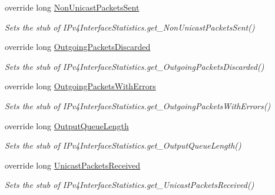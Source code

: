 \begin{DoxyCompactItemize}
override long \hyperlink{class_system_1_1_net_1_1_network_information_1_1_fakes_1_1_stub_i_pv4_interface_statistics_af027ee39d3f0a87b27ffb128e4765782}{Non\-Unicast\-Packets\-Sent}
\begin{DoxyCompactList}\small\item\em Sets the stub of I\-Pv4\-Interface\-Statistics.\-get\-\_\-\-Non\-Unicast\-Packets\-Sent()\end{DoxyCompactList}\item 
override long \hyperlink{class_system_1_1_net_1_1_network_information_1_1_fakes_1_1_stub_i_pv4_interface_statistics_a10319c5811007eefa7d71c19aee2edcc}{Outgoing\-Packets\-Discarded}
\begin{DoxyCompactList}\small\item\em Sets the stub of I\-Pv4\-Interface\-Statistics.\-get\-\_\-\-Outgoing\-Packets\-Discarded()\end{DoxyCompactList}\item 
override long \hyperlink{class_system_1_1_net_1_1_network_information_1_1_fakes_1_1_stub_i_pv4_interface_statistics_ab53dafc2110d16dbc34435896f55e4a5}{Outgoing\-Packets\-With\-Errors}
\begin{DoxyCompactList}\small\item\em Sets the stub of I\-Pv4\-Interface\-Statistics.\-get\-\_\-\-Outgoing\-Packets\-With\-Errors()\end{DoxyCompactList}\item 
override long \hyperlink{class_system_1_1_net_1_1_network_information_1_1_fakes_1_1_stub_i_pv4_interface_statistics_a99b1f955d1195dd9695cd6c0826d02a5}{Output\-Queue\-Length}
\begin{DoxyCompactList}\small\item\em Sets the stub of I\-Pv4\-Interface\-Statistics.\-get\-\_\-\-Output\-Queue\-Length()\end{DoxyCompactList}\item 
override long \hyperlink{class_system_1_1_net_1_1_network_information_1_1_fakes_1_1_stub_i_pv4_interface_statistics_af2cfeb1de2e845cb7ec03ba4d3db0784}{Unicast\-Packets\-Received}
\begin{DoxyCompactList}\small\item\em Sets the stub of I\-Pv4\-Interface\-Statistics.\-get\-\_\-\-Unicast\-Packets\-Received()\end{DoxyCompactList}\item 

\end{DoxyCompactItemize}
